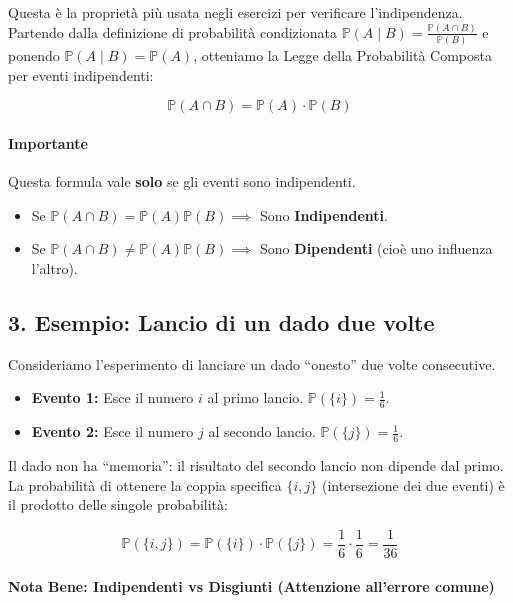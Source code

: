 Questa è la proprietà più usata negli esercizi per verificare l'indipendenza.
\\Partendo dalla definizione di probabilità condizionata $\mathbb{P}(A \mid B) = \frac{\mathbb{P}(A \cap B)}{\mathbb{P}(B)}$ e ponendo $\mathbb{P}(A \mid B) = \mathbb{P}(A)$, otteniamo la Legge della Probabilità Composta per eventi indipendenti:

\begin{equation}
\boxed{\mathbb{P}(A \cap B) = \mathbb{P}(A) \cdot \mathbb{P}(B)}
\end{equation}

\paragraph{Importante}
Questa formula vale \textbf{solo} se gli eventi sono indipendenti.
\begin{itemize}
    \item Se $\mathbb{P}(A \cap B) = \mathbb{P}(A)\mathbb{P}(B) \implies$ Sono \textbf{Indipendenti}.
    \item Se $\mathbb{P}(A \cap B) \neq \mathbb{P}(A)\mathbb{P}(B) \implies$ Sono \textbf{Dipendenti} (cioè uno influenza l'altro).
\end{itemize}

\subsection{3. Esempio: Lancio di un dado due volte}

Consideriamo l'esperimento di lanciare un dado ``onesto'' due volte consecutive.
\begin{itemize}
    \item \textbf{Evento 1:} Esce il numero $i$ al primo lancio. $\mathbb{P}(\{i\}) = \frac{1}{6}$.
    \item \textbf{Evento 2:} Esce il numero $j$ al secondo lancio. $\mathbb{P}(\{j\}) = \frac{1}{6}$.
\end{itemize}

Il dado non ha ``memoria'': il risultato del secondo lancio non dipende dal primo.
\\La probabilità di ottenere la coppia specifica $\{i, j\}$ (intersezione dei due eventi) è il prodotto delle singole probabilità:

\[
\mathbb{P}(\{i, j\}) = \mathbb{P}(\{i\}) \cdot \mathbb{P}(\{j\}) = \frac{1}{6} \cdot \frac{1}{6} = \frac{1}{36}
\]

\paragraph{Nota Bene: Indipendenti vs Disgiunti (Attenzione all'errore comune)}

